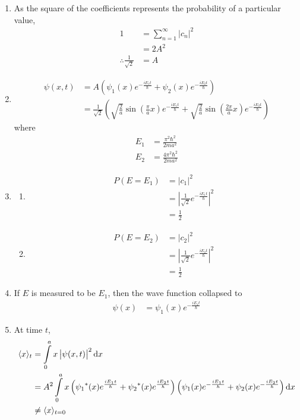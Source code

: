 \documentclass[titlepage, fleqn, a4paper, 12pt, twoside]{article}
\theoremstyle{definition}
\theoremstyle{theorem}
\begin{document}
\begin{solution}
	\begin{enumerate}[leftmargin=*]
		\item
			As the square of the coefficients represents the probability of a particular value,
			\begin{align*}
				1 &= \sum\limits_{n = 1}^{\infty} |c_n|^2\\
				&= 2 A^2\\
				\therefore \frac{1}{\sqrt{2}} &= A
			\end{align*}
		\item
			\begin{align*}
				\psi(x,t) &= A \left( \psi_1(x) e^{-\frac{i E_1 t}{\hbar}} + \psi_2(x) e^{-\frac{i E_2 t}{\hbar}} \right)\\
				&= \frac{1}{\sqrt{2}} \left( \sqrt{\frac{2}{a}} \sin\left( \frac{\pi}{a} x \right) e^{-\frac{i E_1 t}{\hbar}} + \sqrt{\frac{2}{a}} \sin\left( \frac{2 \pi}{a} x \right) e^{-\frac{i E_2 t}{\hbar}} \right)
			\end{align*}
			where
			\begin{align*}
				E_1 &= \frac{\pi^2 \hbar^2}{2 m a^2}\\
				E_2 &= \frac{4 \pi^2 \hbar^2}{2 m a^2}
			\end{align*}
		\item
			\begin{enumerate}[leftmargin=*]
				\item
					\begin{align*}
						P(E = E_1) &= |c_1|^2\\
						&= \left| \frac{1}{\sqrt{2}} e^{-\frac{i E_1 t}{\hbar}} \right|^2\\
						&= \frac{1}{2}
					\end{align*}
				\item
					\begin{align*}
						P(E = E_2) &= |c_2|^2\\
						&= \left| \frac{1}{\sqrt{2}} e^{-\frac{i E_2 t}{\hbar}} \right|^2\\
						&= \frac{1}{2}
					\end{align*}
			\end{enumerate}
		\item
			If $E$ is measured to be $E_1$, then the wave function collapsed to
			\begin{align*}
				\psi(x) &= \psi_1(x) e^{-\frac{i E_1 t}{\hbar}}
			\end{align*}
		\item
			At time $t$,
			\begin{align*}
				\langle x \rangle_t &= \int\limits_{0}^{a} x \left| \psi(x,t) \right|^2 \dif x\\
				&= A^2 \int\limits_{0}^{a} x \left( {\psi_1}^*(x) e^{\frac{i E_1 t}{\hbar}} + {\psi_2}^*(x) e^{\frac{i E_2 t}{\hbar}} \right) \left( \psi_1(x) e^{-\frac{i E_1 t}{\hbar}} + \psi_2(x) e^{-\frac{i E_2 t}{\hbar}} \right) \dif x\\
				&\neq \langle x \rangle_{t = 0}
			\end{align*}
	\end{enumerate}
\end{solution}
\end{document}

